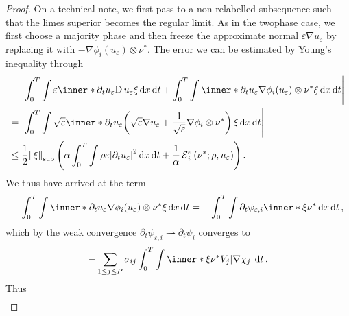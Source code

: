 \begin{proof}
	On a technical note, we first pass to a non-relabelled subsequence such 
	that the limes superior becomes the regular limit.
	As in the twophase case, we first choose a majority phase and then freeze 
	the approximate normal $ \varepsilon \nabla u_{ \varepsilon } $ by 
	replacing it with $ - \nabla \phi_{ i } ( u_{ \varepsilon } ) \otimes \nu^{ 
		\ast } $. The error we can be estimated by Young's inequality through
	\begin{align*}
		& \abs{
			\int_{ 0 }^{ T }
			\int
			\varepsilon
			\inner*{ \partial_{  t } u_{ 
					\varepsilon } }{ \diff u_{ \varepsilon } \xi }
			\dd{ x }
			\dd{ t }
			+
			\int_{ 0 }^{ T }
			\int
			\inner*{ \partial_{ t } u_{ \varepsilon } }{ \nabla \phi_{ 
					i } ( u_{ \varepsilon } ) \otimes 
				\nu^{ \ast } \xi }
			\dd{ x }
			\dd{ t }
		}
		\\
		={} &
		\abs{
			\int_{ 0 }^{ T }
			\int
			\sqrt{ \varepsilon }
			\inner*
			{ \partial_{ t } u_{ \varepsilon } }{ 
				\left(
				\sqrt{ \varepsilon } \nabla u_{ \varepsilon }
				+
				\frac{ 1 }{ \sqrt{ \varepsilon } }
				\nabla \phi_{ i } \otimes \nu^{ \ast } 
				\right)
				\xi 
			}
			\dd{ x }
			\dd{ t }
		}
		\\
		\leq{} &
		\frac{ 1 }{ 2 }
		\norm{ \xi }_{ \mathrm{sup} }
		\left(
		\alpha 
		\int_{ 0 }^{ T }
		\int
		\rho \varepsilon 
		\abs{ \partial_{ t } u_{ \varepsilon } }^{ 2 }
		\dd{ x }
		\dd{ t }
		+
		\frac{ 1 }{ \alpha }
		\tilt_excess_{ i }^{ \varepsilon } \left( \nu^{ \ast } ; \rho , 
		u_{ 
			\varepsilon }  \right)
		\right).
	\end{align*}
	We thus have arrived at the term
	\begin{equation*}
		- \int_{ 0 }^{ T }
		\int
		\inner*{ \partial_{ t } u_{ \varepsilon } }{ \nabla \phi_{ i } 
			( u_{ \varepsilon } ) \otimes \nu^{ 
				\ast } \xi }
		\dd{ x }
		\dd{ t }
		= 
		- \int_{ 0 }^{ T }
		\int
		\partial_{ t } \psi_{ \varepsilon , i }
		\inner*{ \xi }{ \nu^{ \ast } }
		\dd{ x }
		\dd{ t },
	\end{equation*} 
	which by the weak convergence $ \partial_{ t } \psi_{ \varepsilon,  i } 
	\rightharpoonup \partial_{ t } \psi_{ i } $ converges to
	\begin{equation*}
		- \sum_{ 1 \leq j \leq P }
		\sigma_{ i j }
		\int_{ 0 }^{ T }
		\int
		\inner*{ \xi }{ \nu^{ \ast } }
		V_{ j }
		\abs{ \nabla \chi_{ j } }
		\dd{ t }.
	\end{equation*}
	Thus
	\begin{align*}

\end{align*}
\end{proof}

